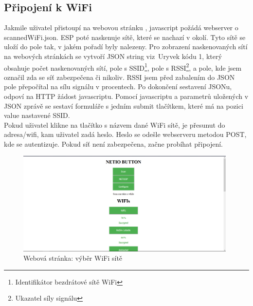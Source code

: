 \documentclass[a4paper, 12pt]{report}
\begin{document}
    \subsection{Připojení k WiFi}
    Jakmile uživatel přistoupí na webovou stránku , javascript požádá webserver o scannedWiFi.json.
    ESP poté naskenuje sítě, které se nachazí v okolí.
    Tyto sítě se uloží do pole tak, v jakém pořadí byly nalezeny.
    Pro zobrazení naskenovaných sítí na webových stránkách se vytvoří JSON string viz\ Uryvek kódu 1, který obsahuje počet naskenovaných sítí, pole s SSID\footnote{Identifikátor bezdrátové sítě WiFi}, pole s RSSI\footnote{Ukazatel síly signálu}, a pole, kde jsem označil zda se síť zabezpečena či nikoliv.
    RSSI jsem před zabalením do JSON pole přepočítal na sílu signálu v procentech.
    Po dokončení sestavení JSONu, odpoví na HTTP žádost javascriptu.
    Pomocí javascriptu a parametrů uložených v JSON zprávě se sestaví formuláře s jedním submit tlačítkem, které má na pozici value nastavené SSID.\\
    Pokud uživatel klikne na tlačítko s názvem dané WiFi sítě, je přesunut do adresa/wifi, kam uživatel zadá heslo.
    Heslo se odešle webserveru metodou POST, kde se autentizuje.
    Pokud síť není zabezpečena, začne probíhat připojení.

    \begin{figure}
        \centering
        \includegraphics[width= 11cm]{images/webscreen}
        \caption{Webová stránka: výběr WiFi sítě}
        \label{fig:website}
    \end{figure}
    
\end{document}
